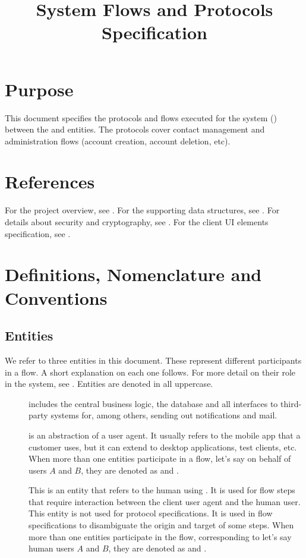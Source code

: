\documentclass[a4paper,10pt]{article}
\title{\longProduct{} System Flows and Protocols Specification}
\begin{document}
\maketitle
\tableofcontents

\section{Purpose}
This document specifies the protocols and flows executed for the \longProduct{} system (\shortProduct{}) between the \server{} and \client{} entities. The protocols cover contact 
management and administration flows (account creation, account deletion, etc).

\section{References}
For the project overview, see \cite{project_spec}. For the supporting data structures, see \cite{data_structure_spec}. For details about security and cryptography, 
see \cite{crypto_spec}. For the client UI elements specification, see \cite{UI_spec}.

\section{Definitions, Nomenclature and Conventions}

\subsection{Entities}
We refer to three entities in this document. These represent different participants in a flow. A short explanation on each one follows. For more detail on their role in the 
system, see \cite{project_spec}. Entities are denoted in all uppercase.

\begin{description}
 \item[\Server{}] includes the central business logic, the database and all interfaces to third-party systems for, among others, sending out notifications and mail.
 \item[\Client{}] is an abstraction of a user agent. It usually refers to the mobile app that a customer uses, but it can extend to desktop applications, test clients, etc. When 
more than one \client{} entities participate in a flow, let's say on behalf of users $A$ and $B$, they are denoted as \client[A] and \client[B].
 \item[\User{}] This is an entity that refers to the human using \Client{}. It is used for flow steps that require interaction between the client user agent and the human user. 
This entity is not used for protocol specifications. It is used in flow specifications to disambiguate the origin and target of some steps. When more than one \user{} entities 
participate in the flow, corresponding to let's say human users $A$ and $B$, they are denoted as \user[A] and \user[B].
\end{description}
\end{document}
